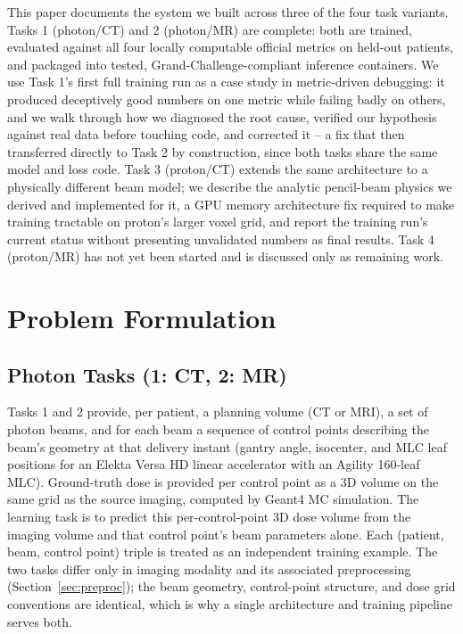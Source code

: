 \documentclass[10pt,conference]{IEEEtran}
\begin{document}
This paper documents the system we built across three of the four task
variants. Tasks 1 (photon/CT) and 2 (photon/MR) are complete: both are
trained, evaluated against all four locally computable official metrics
on held-out patients, and packaged into tested, Grand-Challenge-compliant
inference containers. We use Task 1's first full training run as a case
study in metric-driven debugging: it produced deceptively good numbers
on one metric while failing badly on others, and we walk through how we
diagnosed the root cause, verified our hypothesis against real data
before touching code, and corrected it -- a fix that then transferred
directly to Task 2 by construction, since both tasks share the same
model and loss code. Task 3 (proton/CT) extends the same architecture to
a physically different beam model; we describe the analytic pencil-beam
physics we derived and implemented for it, a GPU memory architecture
fix required to make training tractable on proton's larger voxel grid,
and report the training run's current status without presenting
unvalidated numbers as final results. Task 4 (proton/MR) has not yet been
started and is discussed only as remaining work.

\section{Problem Formulation}

\subsection{Photon Tasks (1: CT, 2: MR)}

Tasks 1 and 2 provide, per patient, a planning volume (CT or MRI), a set
of photon beams, and for each beam a sequence of control points
describing the beam's geometry at that delivery instant (gantry angle,
isocenter, and MLC leaf positions for an Elekta Versa HD linear
accelerator with an Agility 160-leaf MLC). Ground-truth dose is provided
per control point as a 3D volume on the same grid as the source imaging,
computed by Geant4 MC simulation. The learning task is to predict this
per-control-point 3D dose volume from the imaging volume and that
control point's beam parameters alone. Each (patient, beam, control
point) triple is treated as an independent training example. The two
tasks differ only in imaging modality and its associated preprocessing
(Section~\ref{sec:preproc}); the beam geometry, control-point structure,
and dose grid conventions are identical, which is why a single
architecture and training pipeline serves both.
\end{document}
